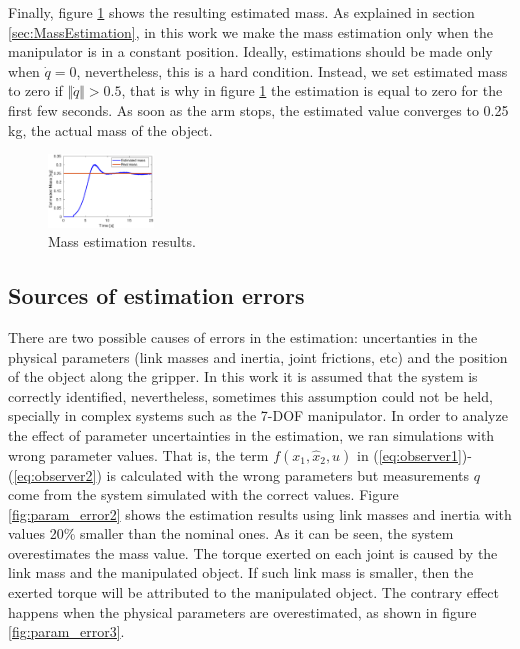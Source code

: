 \documentclass[conference,letterpaper]{ieeeconf}
\begin{document}
Finally, figure \ref{fig:MassEstimation} shows the resulting estimated mass. As explained in section \ref{sec:MassEstimation}, in this work we make the mass estimation only when the manipulator is in a constant position. Ideally, estimations should be made only when $\dot{q}=0$, nevertheless, this is a hard condition. Instead, we set estimated mass to zero if $\Vert\dot{q}\Vert > 0.5$, that is why in figure \ref{fig:MassEstimation} the estimation is equal to zero for the first few seconds. As soon as the arm stops, the estimated value converges to 0.25 kg, the actual mass of the object. 
\begin{figure}
  \centering
  \includegraphics[width=0.25\textwidth]{Figures/result_mass.eps}
  \caption{Mass estimation results.}
  \label{fig:MassEstimation}
\end{figure}

\subsection{Sources of estimation errors}
There are two possible causes of errors in the estimation: uncertanties in the physical parameters (link masses and inertia, joint frictions, etc) and the position of the object along the gripper. In this work it is assumed that the system is correctly identified, nevertheless, sometimes this assumption could not be held, specially in complex systems such as the 7-DOF manipulator. In order to analyze the effect of parameter uncertainties in the estimation, we ran simulations with wrong parameter values. That is, the term $f(x_1, \hat{x}_2, u)$ in (\ref{eq:observer1})-(\ref{eq:observer2}) is calculated with the wrong parameters but measurements $q$ come from the system simulated with the correct values. Figure \ref{fig:param_error2} shows the estimation results using link masses and inertia with values 20\% smaller than the nominal ones. As it can be seen, the system overestimates the mass value. The torque exerted on each joint is caused by the link mass and the manipulated object. If such link mass is smaller, then the exerted torque will be attributed to the manipulated object. The contrary effect happens when the physical parameters are overestimated, as shown in figure \ref{fig:param_error3}.
\end{document}
